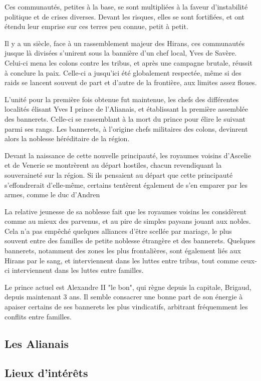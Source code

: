 \documentclass[10pt,a4paper,twocolumn]{book}
\begin{document}
Ces communautés, petites à la base, se sont multipliées à la faveur d'instabilité politique et de crises diverses. Devant les risques, elles se sont fortifiées, et ont étendu leur emprise sur ces terres peu connue, petit à petit. 

Il y a un siècle, face à un rassemblement majeur des Hirans, ces communautés jusque là divisées s'unirent sous la bannière d'un chef local, Yves de Savère. Celui-ci mena les colons contre les tribus, et après une campagne brutale, réussit à conclure la paix. Celle-ci a jusqu'ici été globalement respectée, même si des raids se lancent souvent de part et d'autre de la frontière, aux limites assez floues.

L'unité pour la première fois obtenue fut maintenue, les chefs des différentes localités élisant Yves I prince de l'Alianais, et établissant la première assemblée des bannerets. Celle-ci se rassemblant à la mort du prince pour élire le suivant parmi ses rangs. Les bannerets, à l'origine chefs militaires des colons, devinrent alors la noblesse héréditaire de la région.

Devant la naissance de cette nouvelle principauté, les royaumes voisins d'Ascelie et de Venerie se montrèrent au départ hostiles, chacun revendiquant la souveraineté sur la région. Si ils pensaient au départ que cette principauté s'effondrerait d'elle-même, certains tentèrent également de s'en emparer par les armes, comme le duc d'Andren

La relative jeunesse de sa noblesse fait que les royaumes voisins les considèrent comme au mieux des parvenus, et au pire de simples paysans jouant aux nobles. Cela n'a pas empêché quelques alliances d'être scellée par mariage, le plus souvent entre des familles de petite noblesse étrangère et des bannerets. Quelques bannerets, notamment des zones les plus frontalières, sont également liés aux Hirans par le sang, et interviennent dans les luttes entre tribus, tout comme ceux-ci interviennent dans les luttes entre familles.

Le prince actuel est Alexandre II "le bon", qui règne depuis la capitale, Brigaud, depuis maintenant 3 ans. Il semble consacrer une bonne part de son énergie à apaiser certains de ses bannerets les plus vindicatifs, arbitrant fréquemment les conflits entre familles.
\subsection{Les Alianais}
\subsection{Lieux d'intérêts}
\end{document}
